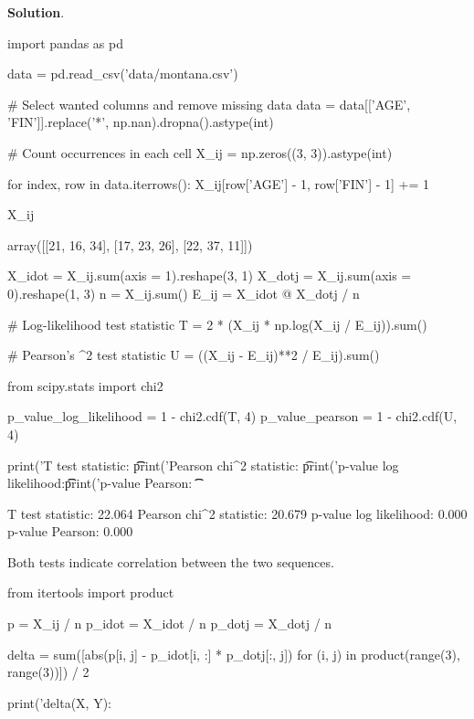 \textbf{Solution}.

\begin{python}
import pandas as pd

data = pd.read_csv('data/montana.csv')

# Select wanted columns and remove missing data
data = data[['AGE', 'FIN']].replace('*', np.nan).dropna().astype(int)
\end{python}

\begin{python}
# Count occurrences in each cell
X_ij = np.zeros((3, 3)).astype(int)

for index, row in data.iterrows():
     X_ij[row['AGE'] - 1, row['FIN'] - 1] += 1
           
X_ij
\end{python}

\begin{console}
array([[21, 16, 34],
       [17, 23, 26],
       [22, 37, 11]])
\end{console}

\begin{python}
X_idot = X_ij.sum(axis = 1).reshape(3, 1)
X_dotj = X_ij.sum(axis = 0).reshape(1, 3)
n = X_ij.sum()
E_ij = X_idot @ X_dotj / n

# Log-likelihood test statistic
T = 2 * (X_ij * np.log(X_ij / E_ij)).sum()

# Pearson's \chi^{2} test statistic
U = ((X_ij - E_ij)**2 / E_ij).sum()
\end{python}

\begin{python}
from scipy.stats import chi2

p_value_log_likelihood = 1 - chi2.cdf(T, 4)
p_value_pearson = 1 - chi2.cdf(U, 4)

print('T test statistic: \t\t%
print('Pearson chi^{2} statistic: \t%

print('p-value log likelihood:\t\t %
print('p-value Pearson: \t\t %
\end{python}

\begin{console}
T test statistic:               22.064
Pearson chi^{2} statistic:        20.679
p-value log likelihood:          0.000
p-value Pearson:                 0.000
\end{console}

Both tests indicate correlation between the two sequences.

\begin{python}
from itertools import product

p = X_ij / n
p_idot = X_idot / n
p_dotj = X_dotj / n

delta = sum([abs(p[i, j] - p_idot[i, :] * p_dotj[:, j]) 
            for (i, j) in product(range(3), range(3))]) / 2

print('delta(X, Y): %
\end{python}

